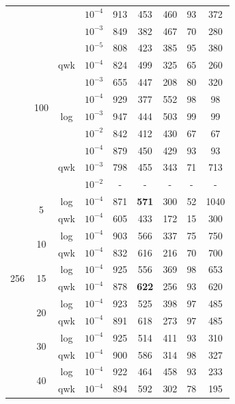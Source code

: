 \documentclass[times,twocolumn,final,authoryear]{elsarticle}
\begin{document}
\begin{table}[h!]
{\begin{tabular}{c|c|c|c|c|c|c|c|c}
		& & & $10^{-4}$ & 913 & 453 & 460 & 93 & 372\\
		& & & $10^{-3}$ & 849 & 382 & 467 & 70 & 280\\\cline{3-9}
		& & \multirow{3}{*}{qwk} & $10^{-5}$ & 808 & 423 & 385 & 95 & 380\\
		& & & $10^{-4}$ & 824 & 499 & 325 & 65 & 260\\
		& & & $10^{-3}$ & 655 & 447 & 208 & 80 & 320\\\cline{2-9}
		& \multirow{2}{*}{100} & \multirow{3}{*}{log} & $10^{-4}$ & 929 & 377 & 552 & 98 & 98\\
		& & & $10^{-3}$ & 947 & 444 & 503 & 99 & 99\\
		& & & $10^{-2}$ & 842 & 412 & 430 & 67 & 67\\\cline{3-9}
		& & \multirow{3}{*}{qwk} & $10^{-4}$ & 879 & 450 & 429 & 93 & 93\\
		& & & $10^{-3}$ & 798 & 455 & 343 & 71 & 713\\
		& & & $10^{-2}$ & - & - & - & - & -\\
		\hline	
		\multirow{10}{*}{256} & \multirow{2}{*}{5} & \multirow{1}{*}{log} & $10^{-4}$ & 871 & \textbf{571} & 300 & 52 & 1040\\\cline{3-9}
		& & \multirow{1}{*}{qwk} & $10^{-4}$ & 605 & 433 & 172 & 15 & 300\\\cline{2-9}
		&\multirow{2}{*}{10} & \multirow{1}{*}{log} & $10^{-4}$ & 903 & 566  & 337 & 75 & 750\\\cline{3-9}
		& & \multirow{1}{*}{qwk} & $10^{-4}$ & 832 & 616 & 216 & 70 & 700\\\cline{2-9}		
		& \multirow{2}{*}{15} & \multirow{1}{*}{log} & $10^{-4}$ & 925 & 556 & 369 & 98 & 653\\\cline{3-9}
		& & \multirow{1}{*}{qwk} & $10^{-4}$ & 878 & \textbf{622} & 256 & 93 & 620\\\cline{2-9}
		& \multirow{2}{*}{20} & \multirow{1}{*}{log} & $10^{-4}$ & 923 & 525 & 398 & 97 & 485\\\cline{3-9}
		& & \multirow{1}{*}{qwk} & $10^{-4}$ & 891 & 618 & 273 & 97 & 485 \\\cline{2-9}		
		& \multirow{2}{*}{30} & \multirow{1}{*}{log} & $10^{-4}$ & 925 & 514 & 411 & 93 & 310\\\cline{3-9}
		& & \multirow{1}{*}{qwk} & $10^{-4}$ & 900 & 586 & 314 & 98 & 327\\\cline{2-9}
		& \multirow{2}{*}{40} & \multirow{1}{*}{log} & $10^{-4}$ & 922 & 464 & 458 & 93 & 233\\\cline{3-9}
		& & \multirow{1}{*}{qwk} & $10^{-4}$ & 894 & 592 & 302 & 78 & 195\\\cline{2-9}

\end{tabular}}
\end{table}
\end{document}
